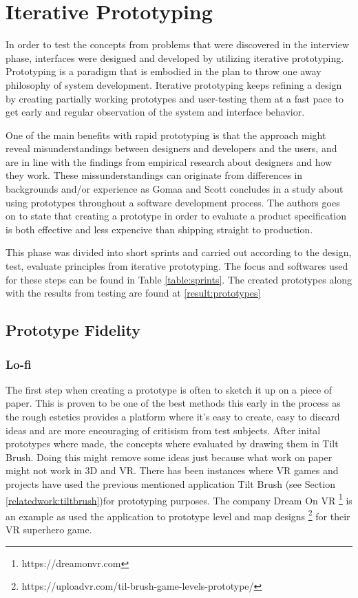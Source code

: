 \section{Iterative Prototyping}
In order to test the concepts from problems that were discovered in the interview phase, interfaces were designed and developed by utilizing iterative prototyping. Prototyping is a paradigm that is embodied in the plan to throw one away philosophy of system development. \cite{proto:Gomaa1981} Iterative prototyping keeps refining a design by creating partially working prototypes and user-testing them at a fast pace to get early and regular observation of the system and interface behavior.\cite{proto:hartson2012ux}

One of the main benefits with rapid prototyping is that the approach might reveal misunderstandings between designers and developers and the users, and are in line with the findings from empirical research about designers and how they work\cite{proto:tripp1990rapid}. These missunderstandings can originate from differences in backgrounds and/or experience as Gomaa and Scott concludes in a study about using prototypes throughout a software development process.\cite{proto:Lichter1993} The authors goes on to state that creating a prototype in order to evaluate a product specification is both effective and less expencive than shipping straight to production.

This phase was divided into short sprints and carried out according to the design, test, evaluate principles from iterative prototyping.\cite{proto:hartson2012ux} The focus and softwares used for these steps can be found in Table \ref{table:sprints}. The created prototypes along with the results from testing are found at \ref{result:prototypes}
\subsection{Prototype Fidelity}
\subsubsection{Lo-fi}
\label{method:prototype:lofi}
The first step when creating a prototype is often to sketch it up on a piece of paper. This is proven to be one of the best methods this early in the process as the rough estetics provides a platform where it's easy to create, easy to discard ideas and are more encouraging of critisism from test subjects. \cite{proto:boling1997holistic} After inital prototypes where made, the concepts where evaluated by drawing them in Tilt Brush. Doing this might remove some ideas just because what work on paper might not work in 3D and VR. There has been instances where VR games and projects have used the previous mentioned application Tilt Brush (see Section \ref{relatedwork:tiltbrush})for prototyping purposes. The company Dream On VR \footnote{https://dreamonvr.com} is an example as used the application to prototype level and map designs \footnote{https://uploadvr.com/til-brush-game-levels-prototype/} for their VR superhero game.

